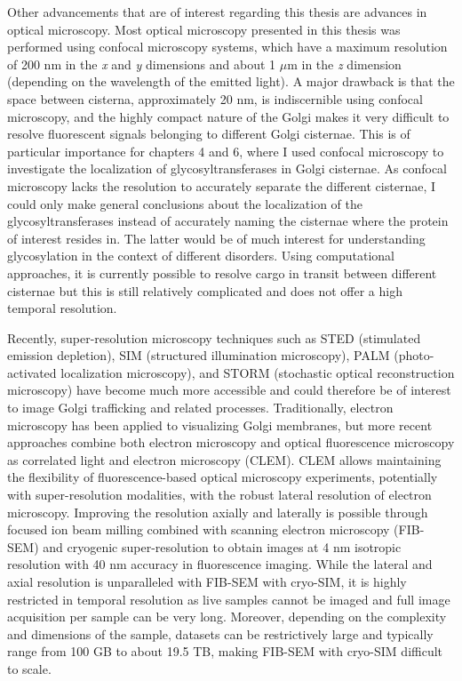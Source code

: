 Other advancements that are of interest regarding this thesis are advances in optical microscopy. Most optical microscopy presented in this thesis was performed using confocal microscopy systems, which have a maximum resolution of 200 nm in the \emph{x} and \emph{y} dimensions and about 1 $\mu$m in the \emph{z} dimension (depending on the wavelength of the emitted light)\cite{st_croix_confocal_2005}. A major drawback is that the space between cisterna, approximately 20 nm, is indiscernible using confocal microscopy, and the highly compact nature of the Golgi makes it very difficult to resolve fluorescent signals belonging to different Golgi cisternae\cite{ladinsky_golgi_1999}. This is of particular importance for chapters 4 and 6, where I used confocal microscopy to investigate the localization of glycosyltransferases in Golgi cisternae. As confocal microscopy lacks the resolution to accurately separate the different cisternae, I could only make general conclusions about the localization of the glycosyltransferases instead of accurately naming the cisternae where the protein of interest resides in. The latter would be of much interest for understanding glycosylation in the context of different disorders. Using computational approaches, it is currently possible to resolve cargo in transit between different cisternae\cite{dickson_rab6_2020} but this is still relatively complicated and does not offer a high temporal resolution.

Recently, super-resolution microscopy techniques such as STED (stimulated emission depletion), SIM (structured illumination microscopy), PALM (photo-activated localization microscopy), and STORM (stochastic optical reconstruction microscopy) have become much more accessible and could therefore be of interest to image Golgi trafficking and related processes. Traditionally, electron microscopy has been applied to visualizing Golgi membranes, but more recent approaches combine both electron microscopy and optical fluorescence microscopy as correlated light and electron microscopy (CLEM)\cite{de_boer_correlated_2015}. CLEM allows maintaining the flexibility of fluorescence-based optical microscopy experiments, potentially with super-resolution modalities\cite{joosten_super-resolution_2018}, with the robust lateral resolution of electron microscopy. Improving the resolution axially and laterally is possible through focused ion beam milling combined with scanning electron microscopy (FIB-SEM) and cryogenic super-resolution to obtain images at 4 nm isotropic resolution with 40 nm accuracy in fluorescence imaging\cite{hoffman_correlative_2020}. While the lateral and axial resolution is unparalleled with FIB-SEM with cryo-SIM, it is highly restricted in temporal resolution as live samples cannot be imaged and full image acquisition per sample can be very long. Moreover, depending on the complexity and dimensions of the sample, datasets can be restrictively large and typically range from 100 GB to about 19.5 TB\cite{hoffman_correlative_2020,xu_enhanced_2017}, making FIB-SEM with cryo-SIM difficult to scale. 

